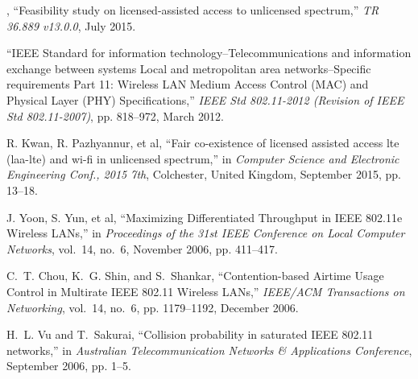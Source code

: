 %

\begin{thebibliography}{99.}%
	, ``Feasibility study on licensed-assisted access to unlicensed spectrum,'' \emph{{TR 36.889 v13.0.0}}, July 2015.

	
	``{IEEE Standard for information technology--Telecommunications and information exchange between systems Local and metropolitan area networks--Specific requirements Part 11: Wireless LAN Medium Access Control (MAC) and Physical Layer (PHY) Specifications},'' \emph{{IEEE Std 802.11-2012 (Revision of IEEE Std 802.11-2007)}}, pp. 818--972, March 2012.

	
	 {R. Kwan, R. Pazhyannur, et al}, ``Fair co-existence of licensed assisted access lte (laa-lte) and wi-fi in unlicensed spectrum,'' in \emph{Computer Science and Electronic Engineering Conf., 2015 7th}, Colchester, United Kingdom, September 2015, pp. 13--18.
	

	
	 {J. Yoon, S. Yun, et al}, ``{Maximizing Differentiated Throughput in IEEE 802.11e Wireless LANs},'' in \emph{{ Proceedings of the 31st IEEE Conference on Local Computer Networks}}, vol.~14, no.~6, November 2006, pp. 411--417.
	
	 C.~T. Chou, K.~G. Shin, and S.~Shankar, ``{Contention-based Airtime Usage Control in Multirate IEEE 802.11 Wireless LANs},'' \emph{{IEEE/ACM Transactions on Networking}}, vol.~14, no.~6, pp. 1179--1192, December 2006.
	
	 H.~L. Vu and T.~Sakurai, ``{Collision probability in saturated IEEE 802.11 networks},'' in \emph{{Australian Telecommunication Networks \& Applications Conference}}, September 2006, pp. 1--5.
\end{thebibliography}


